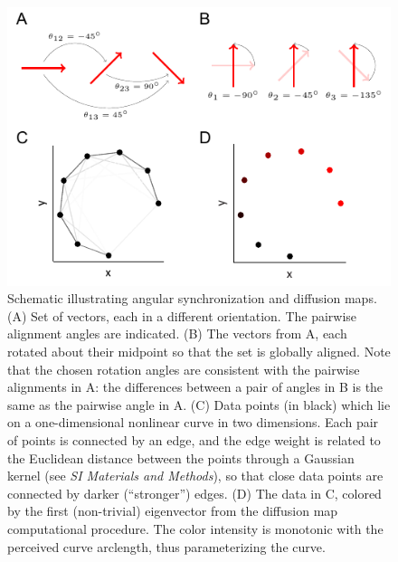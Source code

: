 \documentclass[twocolumn, 10pt]{article}
\newcommand{\SI}[0]{\textit{SI Materials and Methods}}
\begin{document}
\begin{figure}[t]
\includegraphics{fig2}
\caption{Schematic illustrating angular synchronization and diffusion maps. (A) Set of vectors, each in a different orientation. The pairwise alignment angles are indicated. (B) The vectors from A, each rotated about their midpoint so that the set is globally aligned. Note that the chosen rotation angles are consistent with the pairwise alignments in A: the differences between a pair of angles in B is the same as the pairwise angle in A. (C) Data points (in black) which lie on a one-dimensional nonlinear curve in two dimensions. Each pair of points is connected by an edge, and the edge weight is related to the Euclidean distance between the points through a Gaussian kernel (see \SI), so that close data points are connected by darker (``stronger'') edges. (D) The data in C, colored by the first (non-trivial) eigenvector from the diffusion map computational procedure. The color intensity is monotonic with the perceived curve arclength, thus parameterizing the curve.}
\label{fig:schematics}
\end{figure}
\end{document}
